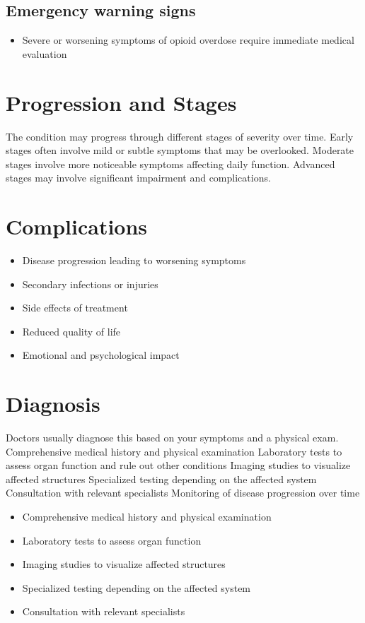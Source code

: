 \subsection{Emergency warning signs}
\begin{itemize}[noitemsep]
  \item Severe or worsening symptoms of opioid overdose require immediate medical evaluation
\end{itemize}
\section{Progression and Stages}
The condition may progress through different stages of severity over time. Early stages often involve mild or subtle symptoms that may be overlooked. Moderate stages involve more noticeable symptoms affecting daily function. Advanced stages may involve significant impairment and complications.
\section{Complications}
\begin{itemize}[noitemsep]
  \item Disease progression leading to worsening symptoms
  \item Secondary infections or injuries
  \item Side effects of treatment
  \item Reduced quality of life
  \item Emotional and psychological impact
\end{itemize}
\section{Diagnosis}
Doctors usually diagnose this based on your symptoms and a physical exam. Comprehensive medical history and physical examination Laboratory tests to assess organ function and rule out other conditions Imaging studies to visualize affected structures Specialized testing depending on the affected system Consultation with relevant specialists Monitoring of disease progression over time

\begin{itemize}[noitemsep]
  \item Comprehensive medical history and physical examination
  \item Laboratory tests to assess organ function
  \item Imaging studies to visualize affected structures
  \item Specialized testing depending on the affected system
  \item Consultation with relevant specialists
\end{itemize}
